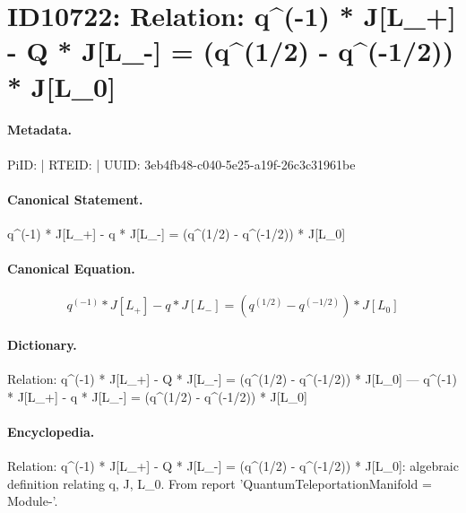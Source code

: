 \section*{ID10722: Relation: q\textasciicircum{}(-1) * J[L\_+] - Q * J[L\_-] = (q\textasciicircum{}(1/2) - q\textasciicircum{}(-1/2)) * J[L\_0]}
\paragraph{Metadata.}
PiID:  | RTEID:  | UUID: 3eb4fb48-c040-5e25-a19f-26c3c31961be

\paragraph{Canonical Statement.}
q\textasciicircum{}(-1) * J[L\_+] - q * J[L\_-] = (q\textasciicircum{}(1/2) - q\textasciicircum{}(-1/2)) * J[L\_0]

\paragraph{Canonical Equation.}
\[
q^(-1) * J[L_+] - q * J[L_-] = (q^(1/2) - q^(-1/2)) * J[L_0]
\]

\paragraph{Dictionary.}
Relation: q\textasciicircum{}(-1) * J[L\_+] - Q * J[L\_-] = (q\textasciicircum{}(1/2) - q\textasciicircum{}(-1/2)) * J[L\_0] — q\textasciicircum{}(-1) * J[L\_+] - q * J[L\_-] = (q\textasciicircum{}(1/2) - q\textasciicircum{}(-1/2)) * J[L\_0]

\paragraph{Encyclopedia.}
Relation: q\textasciicircum{}(-1) * J[L\_+] - Q * J[L\_-] = (q\textasciicircum{}(1/2) - q\textasciicircum{}(-1/2)) * J[L\_0]: algebraic definition relating q, J, L\_0. From report 'QuantumTeleportationManifold = Module-'.
